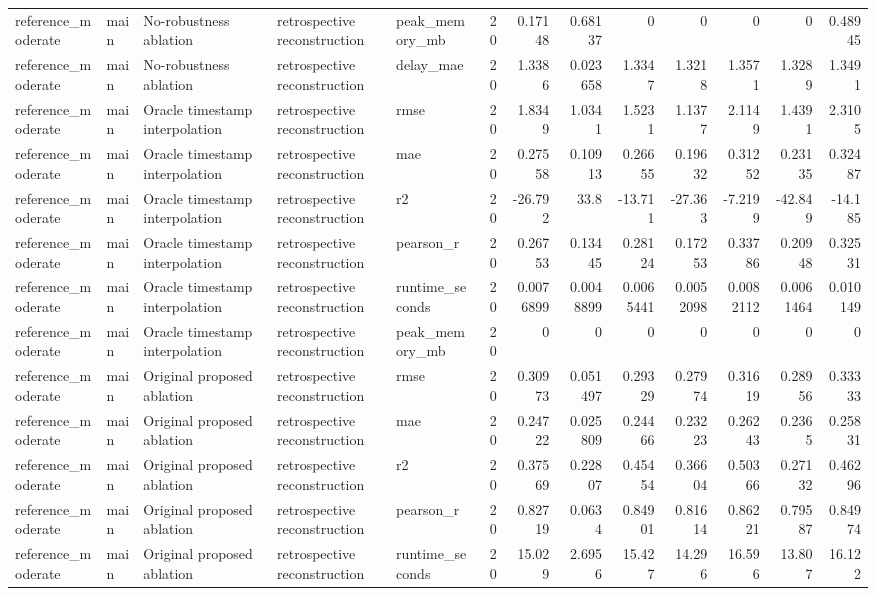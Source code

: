 \begin{table}[!htbp]
{{\begin{tabular}{lllllrrrrrrrr}
reference_moderate & main & No-robustness ablation & retrospective reconstruction & peak_memory_mb & 20 & 0.17148 & 0.68137 & 0 & 0 & 0 & 0 & 0.48945 \\
reference_moderate & main & No-robustness ablation & retrospective reconstruction & delay_mae & 20 & 1.3386 & 0.023658 & 1.3347 & 1.3218 & 1.3571 & 1.3289 & 1.3491 \\
reference_moderate & main & Oracle timestamp interpolation & retrospective reconstruction & rmse & 20 & 1.8349 & 1.0341 & 1.5231 & 1.1377 & 2.1149 & 1.4391 & 2.3105 \\
reference_moderate & main & Oracle timestamp interpolation & retrospective reconstruction & mae & 20 & 0.27558 & 0.10913 & 0.26655 & 0.19632 & 0.31252 & 0.23135 & 0.32487 \\
reference_moderate & main & Oracle timestamp interpolation & retrospective reconstruction & r2 & 20 & -26.792 & 33.8 & -13.711 & -27.363 & -7.2199 & -42.849 & -14.185 \\
reference_moderate & main & Oracle timestamp interpolation & retrospective reconstruction & pearson_r & 20 & 0.26753 & 0.13445 & 0.28124 & 0.17253 & 0.33786 & 0.20948 & 0.32531 \\
reference_moderate & main & Oracle timestamp interpolation & retrospective reconstruction & runtime_seconds & 20 & 0.0076899 & 0.0048899 & 0.0065441 & 0.0052098 & 0.0082112 & 0.0061464 & 0.010149 \\
reference_moderate & main & Oracle timestamp interpolation & retrospective reconstruction & peak_memory_mb & 20 & 0 & 0 & 0 & 0 & 0 & 0 & 0 \\
reference_moderate & main & Original proposed ablation & retrospective reconstruction & rmse & 20 & 0.30973 & 0.051497 & 0.29329 & 0.27974 & 0.31619 & 0.28956 & 0.33333 \\
reference_moderate & main & Original proposed ablation & retrospective reconstruction & mae & 20 & 0.24722 & 0.025809 & 0.24466 & 0.23223 & 0.26243 & 0.2365 & 0.25831 \\
reference_moderate & main & Original proposed ablation & retrospective reconstruction & r2 & 20 & 0.37569 & 0.22807 & 0.45454 & 0.36604 & 0.50366 & 0.27132 & 0.46296 \\
reference_moderate & main & Original proposed ablation & retrospective reconstruction & pearson_r & 20 & 0.82719 & 0.0634 & 0.84901 & 0.81614 & 0.86221 & 0.79587 & 0.84974 \\
reference_moderate & main & Original proposed ablation & retrospective reconstruction & runtime_seconds & 20 & 15.029 & 2.6956 & 15.427 & 14.296 & 16.596 & 13.807 & 16.122 \\

\end{tabular}}}
\end{table}
